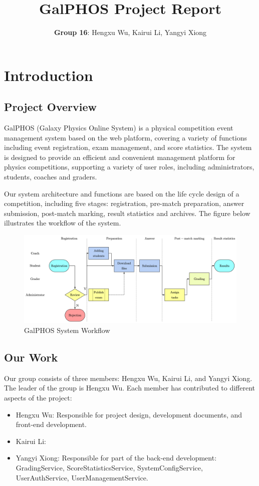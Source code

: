 \documentclass[12pt]{article}
\title{GalPHOS Project Report}
\author{\textbf{Group 16}: Hengxu Wu, Kairui Li, Yangyi Xiong}
\date{}
\begin{document}
\maketitle

\section{Introduction}
\subsection{Project Overview}

GalPHOS (Galaxy Physics Online System) is a physical competition event management system based on the web platform, covering a variety of functions including event registration, exam management, and score statistics. The system is designed to provide an efficient and convenient management platform for physics competitions, supporting a variety of user roles, including administrators, students, coaches and graders.

Our system architecture and functions are based on the life cycle design of a competition, including five stages: registration, pre-match preparation, answer submission, post-match marking, result statistics and archives. The figure below illustrates the workflow of the system.
\begin{figure}[H]
    \centering
    \includegraphics[width=\textwidth]{Fig1.png}
    \caption{GalPHOS System Workflow}
    \label{fig:workflow}
\end{figure}

\subsection{Our Work}

Our group consists of three members: Hengxu Wu, Kairui Li, and Yangyi Xiong. The leader of the group is Hengxu Wu. Each member has contributed to different aspects of the project:
\begin{itemize}
    \item Hengxu Wu: Responsible for project design, development documents, and front-end development.
    \item Kairui Li: %
    \item Yangyi Xiong: Responsible for part of the back-end development: GradingService, ScoreStatisticsService, SystemConfigService, UserAuthService, UserManagementService.
\end{itemize}
\end{document}
